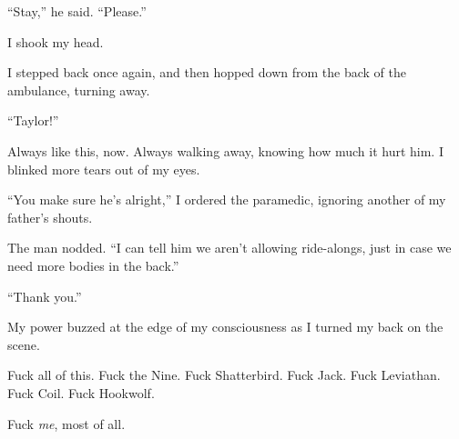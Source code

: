 ``Stay,'' he said.  ``Please.''



I shook my head.



I stepped back once again, and then hopped down from the back of the ambulance, turning away.



``Taylor!''



Always like this, now.  Always walking away, knowing how much it hurt him.  I blinked more tears out of my eyes.



``You make sure he's alright,'' I ordered the paramedic, ignoring another of my father's shouts.



The man nodded.  ``I can tell him we aren't allowing ride-alongs, just in case we need more bodies in the back.''



``Thank you.''



My power buzzed at the edge of my consciousness as I turned my back on the scene.



Fuck all of this.  Fuck the Nine.  Fuck Shatterbird.  Fuck Jack.  Fuck Leviathan.  Fuck Coil.  Fuck Hookwolf.



Fuck \emph{me}, most of all.





